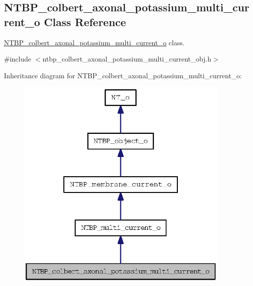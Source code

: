 \subsection{NTBP\_\-colbert\_\-axonal\_\-potassium\_\-multi\_\-current\_\-o Class Reference}
\label{class_n_t_b_p__colbert__axonal__potassium__multi__current__o}


\hyperlink{class_n_t_b_p__colbert__axonal__potassium__multi__current__o}{NTBP\_\-colbert\_\-axonal\_\-potassium\_\-multi\_\-current\_\-o} class.  




{\ttfamily \#include $<$ntbp\_\-colbert\_\-axonal\_\-potassium\_\-multi\_\-current\_\-obj.h$>$}



Inheritance diagram for NTBP\_\-colbert\_\-axonal\_\-potassium\_\-multi\_\-current\_\-o:
\nopagebreak
\begin{figure}[H]
\begin{center}
\leavevmode
\includegraphics[width=296pt]{class_n_t_b_p__colbert__axonal__potassium__multi__current__o__inherit__graph}
\end{center}
\end{figure}


